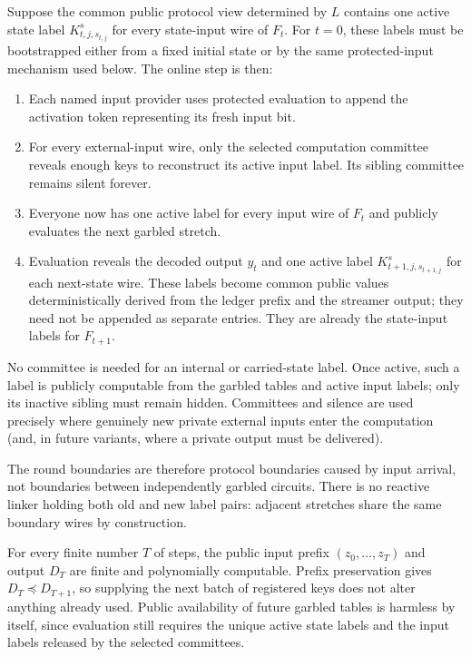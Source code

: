 Suppose the common public protocol view determined by $L$ contains one active
state label $K^s_{t,j,s_{t,j}}$ for every state-input wire of $F_t$. For
$t=0$, these labels must be bootstrapped either from a fixed initial state or
by the same protected-input mechanism used below. The online step is then:
\begin{enumerate}
  \item Each named input provider uses protected evaluation to append the
    activation token representing its fresh input bit.
  \item For every external-input wire, only the selected computation
    committee reveals enough keys to reconstruct its active input label. Its
    sibling committee remains silent forever.
  \item Everyone now has one active label for every input wire of $F_t$ and
    publicly evaluates the next garbled stretch.
  \item Evaluation reveals the decoded output $y_t$ and one active label
    $K^s_{t+1,j,s_{t+1,j}}$ for each next-state wire. These labels become
    common public values deterministically derived from the ledger prefix and
    the streamer output; they need not be appended as separate entries. They
    are already the state-input labels for $F_{t+1}$.
\end{enumerate}

No committee is needed for an internal or carried-state label. Once active,
such a label is publicly computable from the garbled tables and active input
labels; only its inactive sibling must remain hidden. Committees and silence
are used precisely where genuinely new private external inputs enter the
computation (and, in future variants, where a private output must be
delivered).

The round boundaries are therefore protocol boundaries caused by input
arrival, not boundaries between independently garbled circuits. There is no
reactive linker holding both old and new label pairs: adjacent stretches share
the same boundary wires by construction.

For every finite number $T$ of steps, the public input prefix
$(z_0,\ldots,z_T)$ and output $D_T$ are finite and polynomially computable.
Prefix preservation gives $D_T\preceq D_{T+1}$, so supplying the next batch of
registered keys does not alter anything already used. Public availability of
future garbled tables is
harmless by itself, since evaluation still requires the unique active state
labels and the input labels released by the selected committees.


